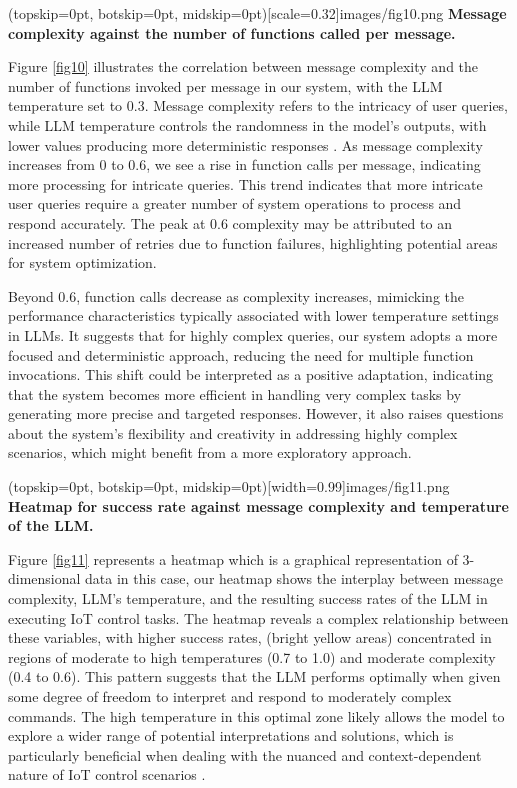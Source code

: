 \documentclass{ieeeaccess}
\begin{document}
\Figure[t!](topskip=0pt, botskip=0pt,
midskip=0pt)[scale=0.32]{{images/fig10.png}}
{ \textbf{Message complexity against the number of functions called per message.}\label{fig10}}

Figure \ref{fig10} illustrates the correlation between message complexity and the number of functions invoked per message in our system, with the LLM temperature set to 0.3. Message complexity refers to the intricacy of user queries, while LLM temperature controls the randomness in the model's outputs, with lower values producing more deterministic responses \cite{rum2024setting}. As message complexity increases from 0 to 0.6, we see a rise in function calls per message, indicating more processing for intricate queries. This trend indicates that more intricate user queries require a greater number of system operations to process and respond accurately. The peak at 0.6 complexity may be attributed to an increased number of retries due to function failures, highlighting potential areas for system optimization. 

Beyond 0.6, function calls decrease as complexity increases, mimicking the performance characteristics typically associated with lower temperature settings in LLMs. It suggests that for highly complex queries, our system adopts a more focused and deterministic approach, reducing the need for multiple function invocations. This shift could be interpreted as a positive adaptation, indicating that the system becomes more efficient in handling very complex tasks by generating more precise and targeted responses. However, it also raises questions about the system's flexibility and creativity in addressing highly complex scenarios, which might benefit from a more exploratory approach.

\Figure[t!](topskip=0pt, botskip=0pt,
midskip=0pt)[width=0.99\columnwidth]{{images/fig11.png}}
{ \textbf{Heatmap for success rate against message complexity and temperature of the LLM.}\label{fig11}}

Figure \ref{fig11} represents a heatmap which is a graphical representation of 3-dimensional data in this case, our heatmap shows the interplay between message complexity, LLM's temperature, and the resulting success rates of the LLM in executing IoT control tasks. The heatmap reveals a complex relationship between these variables, with higher success rates, (bright yellow areas) concentrated in regions of moderate to high temperatures (0.7 to 1.0) and moderate complexity (0.4 to 0.6). This pattern suggests that the LLM performs optimally when given some degree of freedom to interpret and respond to moderately complex commands. The high temperature in this optimal zone likely allows the model to explore a wider range of potential interpretations and solutions, which is particularly beneficial when dealing with the nuanced and context-dependent nature of IoT control scenarios \cite{10315791}. 
\end{document}
